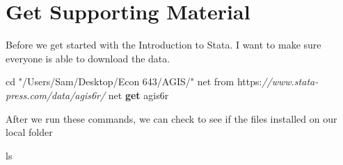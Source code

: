 \documentclass[
]{book}
\newenvironment{Shaded}{\begin{snugshade}}{\end{snugshade}}
\newcommand{\CommentTok}[1]{\textcolor[rgb]{0.56,0.35,0.01}{\textit{#1}}}
\newcommand{\FunctionTok}[1]{\textcolor[rgb]{0.13,0.29,0.53}{\textbf{#1}}}
\newcommand{\NormalTok}[1]{#1}
\newcommand{\StringTok}[1]{\textcolor[rgb]{0.31,0.60,0.02}{#1}}
\begin{document}
\section{Get Supporting Material}\label{get-supporting-material}

Before we get started with the Introduction to Stata. I want to make sure everyone is able to download the data.

\begin{Shaded}
\begin{Highlighting}[]
\NormalTok{cd }\StringTok{"/Users/Sam/Desktop/Econ 643/AGIS/"}
\NormalTok{net from https:}\CommentTok{//www.stata{-}press.com/data/agis6r/}
\NormalTok{net }\FunctionTok{get}\NormalTok{ agis6r}
\end{Highlighting}
\end{Shaded}

After we run these commands, we can check to see if the files installed on our local folder

\begin{Shaded}
\begin{Highlighting}[]
\NormalTok{ls}
\end{Highlighting}
\end{Shaded}
\end{document}
